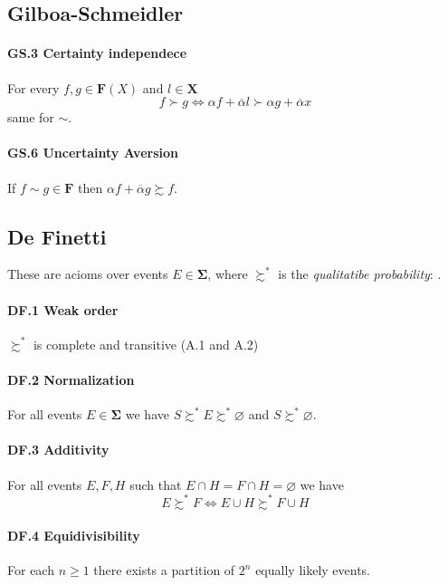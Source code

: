 \documentclass[landscape, 12pt]{extarticle}
\begin{document}
\begin{multicols}{2}
	\subsection{Gilboa-Schmeidler}
	\paragraph{GS.3 Certainty independece}
	For every $f, g \in \bm F(X)$ and $l \in \bm X$
	\[
		f \succ g \iff \alpha f + \overline \alpha l \succ \alpha g + \overline \alpha x
	\]
	same for $\sim$.

	\paragraph{GS.6 Uncertainty Aversion}
	If $f \sim g \in \bm F$ then $\alpha f + \overline \alpha g \succsim f$.

	\subsection{De Finetti}
	These are acioms over events $E \in \bm \Sigma$,
	where $\succsim^*$ is the \textit{qualitatibe probability}:
	.

	\paragraph{DF.1 Weak order}
	$\succsim^*$ is complete and transitive (A.1 and A.2)

	\paragraph{DF.2 Normalization}
	For all events $E \in \bm \Sigma$
	we have $S \succsim^* E \succsim^* \varnothing$
	and $S \succsim^* \varnothing$.

	\paragraph{DF.3 Additivity}
	For all events $E, F, H$ such that $E \cap H = F \cap H = \varnothing$ we have
	\[
		E \succsim^* F \iff E \cup H \succsim^* F \cup H
	\]

	\paragraph{DF.4 Equidivisibility}
	For each $n \geq 1$ there exists a partition of $2^n$ equally likely events.


\end{multicols}
\end{document}
